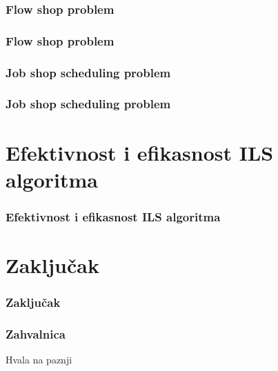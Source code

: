 \documentclass{beamer}
\begin{document}
\subsubsection{Flow shop problem}
\begin{frame}[fragile]\frametitle{Flow shop problem}

\end{frame}

\subsubsection{Job shop scheduling problem}
\begin{frame}[fragile]\frametitle{Job shop scheduling problem}

\end{frame}

\section{Efektivnost i efikasnost ILS algoritma}
\begin{frame}[fragile]\frametitle{Efektivnost i efikasnost ILS algoritma}

\end{frame}

\section{Zaključak}
\begin{frame}[fragile]\frametitle{Zaključak}

\end{frame}

\begin{frame}[fragile]\frametitle{Zahvalnica}
	\thispagestyle{empty}
	\begin{center}
		{\Huge Hvala na paznji}
	\end{center}	
\end{frame}
\end{document}
